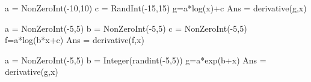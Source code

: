 \begin{sagesilent}
a = NonZeroInt(-10,10)
c = RandInt(-15,15)
g=a*log(x)+c
Ans = derivative(g,x)

\end{sagesilent}



\begin{sagesilent}
a = NonZeroInt(-5,5)
b = NonZeroInt(-5,5)
c = NonZeroInt(-5,5)
f=a*log(b*x+c)
Ans = derivative(f,x)
\end{sagesilent}


\begin{sagesilent}
a = NonZeroInt(-5,5)
b = Integer(randint(-5,5))
g=a*exp(b+x)
Ans = derivative(g,x)
\end{sagesilent}



